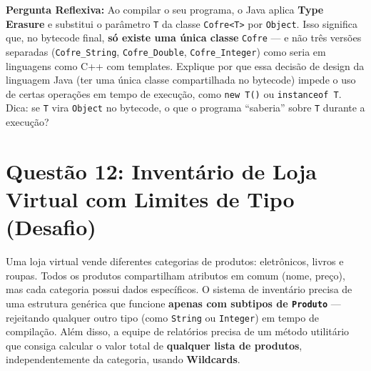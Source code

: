 \documentclass[12pt, a4paper]{article}
\begin{document}
\textbf{Pergunta Reflexiva:} Ao compilar o seu programa, o Java aplica \textbf{Type Erasure} e substitui o parâmetro \texttt{T} da classe \texttt{Cofre<T>} por \texttt{Object}. Isso significa que, no bytecode final, \textbf{só existe uma única classe} \texttt{Cofre} — e não três versões separadas (\texttt{Cofre\_String}, \texttt{Cofre\_Double}, \texttt{Cofre\_Integer}) como seria em linguagens como C++ com templates. Explique por que essa decisão de design da linguagem Java (ter uma única classe compartilhada no bytecode) impede o uso de certas operações em tempo de execução, como \texttt{new T()} ou \texttt{instanceof T}. Dica: se \texttt{T} vira \texttt{Object} no bytecode, o que o programa ``saberia'' sobre \texttt{T} durante a execução?

\vspace{0.2cm}

\section*{Questão 12: Inventário de Loja Virtual com Limites de Tipo (Desafio)}
Uma loja virtual vende diferentes categorias de produtos: eletrônicos, livros e roupas. Todos os produtos compartilham atributos em comum (nome, preço), mas cada categoria possui dados específicos. O sistema de inventário precisa de uma estrutura genérica que funcione \textbf{apenas com subtipos de \texttt{Produto}} — rejeitando qualquer outro tipo (como \texttt{String} ou \texttt{Integer}) em tempo de compilação. Além disso, a equipe de relatórios precisa de um método utilitário que consiga calcular o valor total de \textbf{qualquer lista de produtos}, independentemente da categoria, usando \textbf{Wildcards}.
\end{document}
